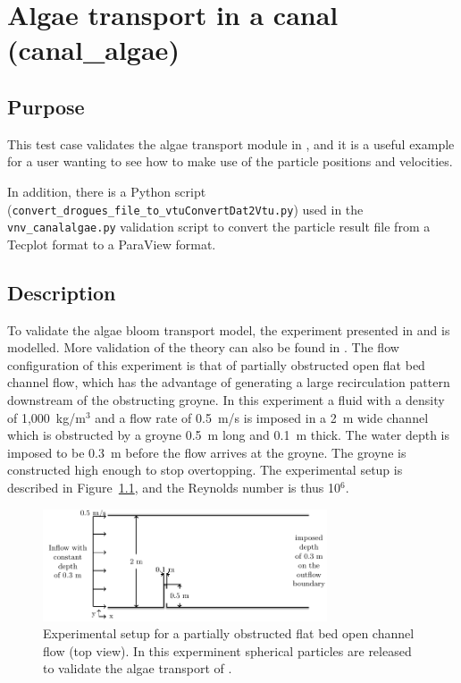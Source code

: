 \chapter{Algae transport in a canal (canal\_algae)}

\section{Purpose}

This test case validates the algae transport module in , and it is a
useful example for a user wanting to see how to make use of the particle
positions and velocities.

In addition, there is a Python script
(\texttt{convert\_drogues\_file\_to\_vtuConvertDat2Vtu.py})
used in the \texttt{vnv\_canalalgae.py} validation script to convert the particle
result file from a Tecplot format to a ParaView format.

\section{Description}

To validate the algae bloom transport model, the experiment presented in
\citet{Joly2011} and \citet{Joly_jhr} is modelled.
More validation of the theory can also be found in \citet{Joly_pof}.
The flow configuration of this experiment is that of partially obstructed open
flat bed channel flow, which has the advantage of generating a large
recirculation pattern downstream of the obstructing groyne.
In this experiment a fluid with a density of 1,000~kg/m$^3$ and a flow rate of
0.5~m/s is imposed in a 2~m wide channel which is obstructed by a groyne 0.5~m
long and 0.1~m thick.
The water depth is imposed to be 0.3~m before the flow arrives at the groyne.
The groyne is constructed high enough to stop overtopping.
The experimental setup is described in Figure~\ref{fig:exp_setup}, and the
Reynolds number is thus 10$^6$.

\begin{figure}[hb]
\begin{center}
  \includegraphics[width=0.75\textwidth]{./img/CanalAlgExpSetup}
\end{center}
\caption{Experimental setup for a partially obstructed flat bed open channel flow (top view). In this experminent
spherical particles are released to validate the algae transport of .}
\label{fig:exp_setup}
\end{figure}

